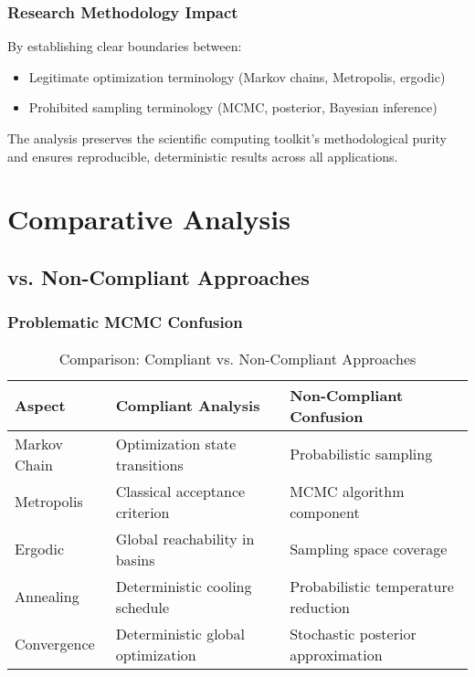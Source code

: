 \documentclass[11pt,a4paper]{article}
\begin{document}
\subsubsection{Research Methodology Impact}
By establishing clear boundaries between:
\begin{itemize}
\item Legitimate optimization terminology (Markov chains, Metropolis, ergodic)
\item Prohibited sampling terminology (MCMC, posterior, Bayesian inference)
\end{itemize}

The analysis preserves the scientific computing toolkit's methodological purity and ensures reproducible, deterministic results across all applications.

\section{Comparative Analysis}

\subsection{vs. Non-Compliant Approaches}

\subsubsection{Problematic MCMC Confusion}
\begin{table}[H]
\centering
\caption{Comparison: Compliant vs. Non-Compliant Approaches}
\label{tab:compliance_comparison}
\begin{tabular}{@{}lp{6cm}p{6cm}@{}}
\toprule
\textbf{Aspect} & \textbf{Compliant Analysis} & \textbf{Non-Compliant Confusion} \\
\midrule
Markov Chain & Optimization state transitions & Probabilistic sampling \\
Metropolis & Classical acceptance criterion & MCMC algorithm component \\
Ergodic & Global reachability in basins & Sampling space coverage \\
Annealing & Deterministic cooling schedule & Probabilistic temperature reduction \\
Convergence & Deterministic global optimization & Stochastic posterior approximation \\
\bottomrule
\end{tabular}
\end{table}
\end{document}
